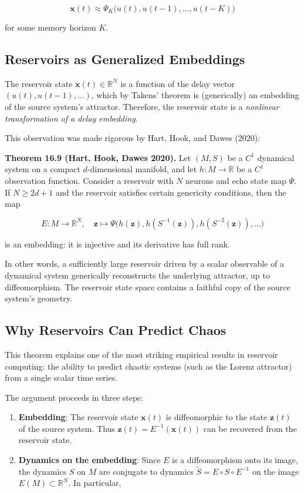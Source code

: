 \[
\mathbf{x}(t) \approx \Psi_K\bigl(u(t), u(t-1), \ldots, u(t-K)\bigr)
\]

for some memory horizon $K$.

\subsection{Reservoirs as Generalized Embeddings}\label{sec:16.5.2}

The reservoir state $\mathbf{x}(t) \in \mathbb{R}^N$ is a function of the delay vector $(u(t), u(t-1), \ldots)$, which by Takens' theorem is (generically) an embedding of the source system's attractor. Therefore, the reservoir state is a \textit{nonlinear transformation of a delay embedding}.

This observation was made rigorous by Hart, Hook, and Dawes (2020):

\textbf{Theorem 16.9 (Hart, Hook, Dawes 2020).} Let $(M, S)$ be a $C^1$ dynamical system on a compact $d$-dimensional manifold, and let $h: M \to \mathbb{R}$ be a $C^1$ observation function. Consider a reservoir with $N$ neurons and echo state map $\Psi$. If $N \geq 2d + 1$ and the reservoir satisfies certain genericity conditions, then the map

\[
E: M \to \mathbb{R}^N, \quad \mathbf{z} \mapsto \Psi\bigl(h(\mathbf{z}), h(S^{-1}(\mathbf{z})), h(S^{-2}(\mathbf{z})), \ldots\bigr)
\]

is an embedding: it is injective and its derivative has full rank.

In other words, a sufficiently large reservoir driven by a scalar observable of a dynamical system generically reconstructs the underlying attractor, up to diffeomorphism. The reservoir state space contains a faithful copy of the source system's geometry.

\subsection{Why Reservoirs Can Predict Chaos}\label{sec:16.5.3}

This theorem explains one of the most striking empirical results in reservoir computing: the ability to predict chaotic systems (such as the Lorenz attractor) from a single scalar time series.

The argument proceeds in three steps:

\begin{enumerate}[nosep]
  \item \textbf{Embedding}: The reservoir state $\mathbf{x}(t)$ is diffeomorphic to the state $\mathbf{z}(t)$ of the source system. Thus $\mathbf{z}(t) = E^{-1}(\mathbf{x}(t))$ can be recovered from the reservoir state.

  \item \textbf{Dynamics on the embedding}: Since $E$ is a diffeomorphism onto its image, the dynamics $S$ on $M$ are conjugate to dynamics $\tilde{S} = E \circ S \circ E^{-1}$ on the image $E(M) \subset \mathbb{R}^N$. In particular,
\end{enumerate}

